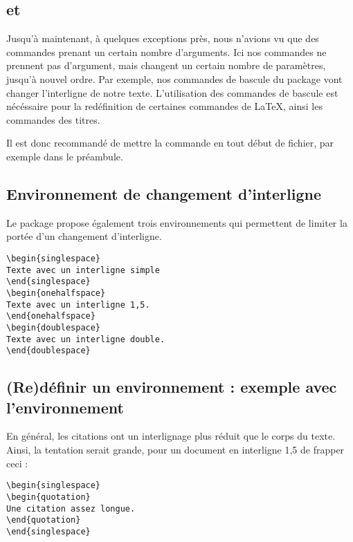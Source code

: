 \subsection{ et }\label{bascule}

Jusqu'à maintenant, à quelques exceptions près, nous n'avions vu que des commandes prenant un certain nombre d'arguments. Ici nos commandes ne prennent pas d'argument, mais changent un certain nombre de paramètres, jusqu'à nouvel ordre. Par exemple, nos commandes de bascule du package  vont changer l'interligne de notre texte. L'utilisation des commandes de bascule est nécéssaire pour la redéfinition de certaines commandes de \LaTeX, ainsi les commandes des titres.

Il est donc recommandé de mettre la commande  en tout début de fichier, par exemple dans le préambule.

\subsection{Environnement de changement d'interligne}

Le package  propose également trois environnements qui permettent de limiter la portée d'un changement d'interligne. 

\begin{verbatim}
\begin{singlespace}
Texte avec un interligne simple
\end{singlespace}
\begin{onehalfspace}
Texte avec un interligne 1,5.
\end{onehalfspace}
\begin{doublespace}
Texte avec un interligne double.
\end{doublespace}
\end{verbatim}

\subsection[Rédéfinir un environnement : quotation]{(Re)définir un environnement : exemple avec l'environnement }

En général, les citations ont un interlignage plus réduit que le corps du texte. Ainsi, la tentation serait grande, pour un document en interligne 1,5 de frapper ceci :

\begin{verbatim}
\begin{singlespace}
\begin{quotation}
Une citation assez longue.
\end{quotation}
\end{singlespace}
\end{verbatim}

